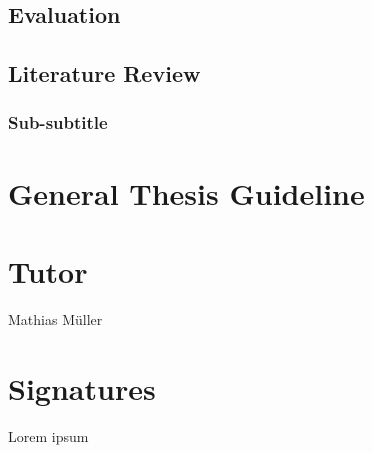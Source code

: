 \documentclass[english]{uzhpub}
\begin{document}
\subsection{Evaluation}
\subsection{Literature Review}

\subsubsection{Sub-subtitle}


\section{General Thesis Guideline}


\section{Tutor}
Mathias M\"uller

\section{Signatures}
Lorem ipsum



\end{document}
